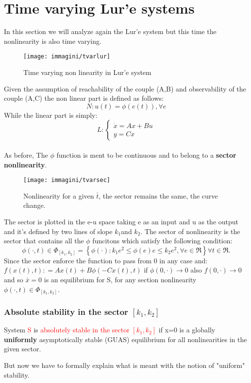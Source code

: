 \section{Time varying Lur'e systems}
In this section we will analyze again the Lur'e system but this time the nonlinearity is also time varying.\begin{figure}[H]
	\centering
	\texttt{[image: immagini/tvarlur]}
	\caption{Time varying non linearity in  Lur'e system}
	\label{fig:tvarlur}
\end{figure}
Given the assumption of reachability of the couple (A,B) and observability of the couple (A,C) the non linear part is defined as follows:
\[
N \colon u(t)=\phi(e(t)), \forall e 
\]
While the linear part is simply:
\[
L:  \begin{cases}
	\dot{x}=Ax+Bu \\ y=Cx
\end{cases}
\] 
\\As before, The $\phi$ function is ment to be continuous and to belong to a \textbf{sector nonlinearity}.
\begin{figure}[H]
	\centering
	\texttt{[image: immagini/tvarsec]}
	\caption{Nonlinearity for a given $\bar{t}$, the sector remains the same, the curve change.}
	\label{fig:tvarsec}
\end{figure}
The sector is plotted in the e-u space taking e as an input and u as the output and it's defined by two lines of slope $k_1$and $k_2$. The sector of nonlinearity is the sector that contains all the $\phi$ funcitons which satisfy the following condition:
\[
\phi(\cdot,t) \in \Phi_{[k_1,k_2]}=\left\{\phi(\cdot)\colon k_1e^2\le\phi(e)e\le k_2e^2, \forall e \in \Re  \right\} \forall t \in \Re.
\]
Since the sector enforce the function to pass from 0 in any case and: $f(x(t),t)\colon=Ax(t)+B\phi(-Cx(t),t)$ if $\phi(0,\cdot)\to 0$ also $f(0,\cdot)\to 0$ and so $\bar{x}=0$ is an equilibrium for S, for any section nonlinearity $\phi(\cdot,t) \in \Phi_{\left[k_1,k_2\right]}$.

\subsubsection{Absolute stability in the sector $[k_1,k_2]$}
\begin{defn}
	System \textcolor{red}{S} is \textcolor{red}{absolutely stable in the sector $[k_1,k_2]$} if x=0 is a globally \textbf{uniformly} asymptotically stable (GUAS) equilibrium for all nonlinearities in the given sector.
\end{defn}
But now we have to formally explain what is meant with the notion of "uniform" stability.

